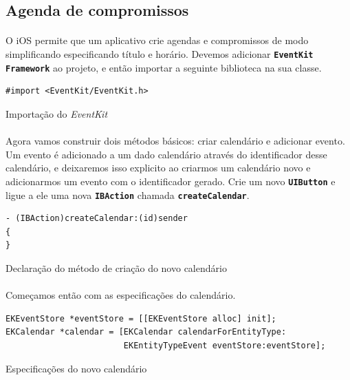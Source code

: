 \documentclass[a4paper,12pt,brazil,doubleside]{book}
\begin{document}
\begin{singlespace}
\section{Agenda de compromissos}

\paragraph{}O iOS permite que um aplicativo crie agendas e compromissos de modo simplificando especificando título e horário. Devemos adicionar \texttt{\textbf{EventKit Framework}} ao projeto, e então importar a seguinte biblioteca na sua classe.

\begin{listing}[H]
\begin{verbatim}
#import <EventKit/EventKit.h>
\end{verbatim}
\caption{Importação do \emph{EventKit}}
\end{listing}

\paragraph{}Agora vamos construir dois métodos básicos: criar calendário e adicionar evento. Um evento é adicionado a um dado calendário através do identificador desse calendário, e deixaremos isso explicito ao criarmos um calendário novo e adicionarmos um evento com o identificador gerado. Crie um novo \texttt{\textbf{UIButton}} e ligue a ele uma nova \texttt{\textbf{IBAction}} chamada \texttt{\textbf{createCalendar}}.

\begin{listing}[H]
\begin{verbatim}
- (IBAction)createCalendar:(id)sender
{
}
\end{verbatim}
\caption{Declaração do método de criação do novo calendário}
\end{listing}

\paragraph{}Começamos então com as especificações do calendário.

\begin{listing}[H]
\begin{verbatim}
EKEventStore *eventStore = [[EKEventStore alloc] init];
EKCalendar *calendar = [EKCalendar calendarForEntityType:
						EKEntityTypeEvent eventStore:eventStore];
\end{verbatim}
\caption{Especificações do novo calendário}
\end{listing}


\end{singlespace}
\end{document}
